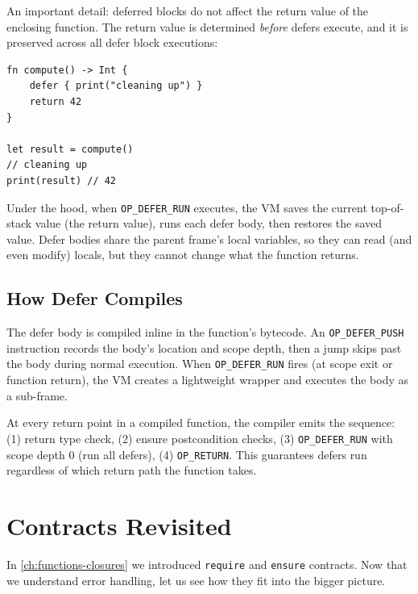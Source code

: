 An important detail: deferred blocks do not affect the return value of the enclosing function. The return value is determined \emph{before} defers execute, and it is preserved across all defer block executions:

\begin{lstlisting}[language=Lattice, caption={Defer does not alter return values}]
fn compute() -> Int {
    defer { print("cleaning up") }
    return 42
}

let result = compute()
// cleaning up
print(result) // 42
\end{lstlisting}

Under the hood, when \lstinline|OP_DEFER_RUN| executes, the VM saves the current top-of-stack value (the return value), runs each defer body, then restores the saved value. Defer bodies share the parent frame's local variables, so they can read (and even modify) locals, but they cannot change what the function returns.

\subsection{How Defer Compiles}\label{sec:defer-compilation}

The defer body is compiled inline in the function's bytecode. An \lstinline|OP_DEFER_PUSH| instruction records the body's location and scope depth, then a jump skips past the body during normal execution. When \lstinline|OP_DEFER_RUN| fires (at scope exit or function return), the VM creates a lightweight wrapper and executes the body as a sub-frame.

At every return point in a compiled function, the compiler emits the sequence: (1) return type check, (2) ensure postcondition checks, (3) \lstinline|OP_DEFER_RUN| with scope depth 0 (run all defers), (4) \lstinline|OP_RETURN|. This guarantees defers run regardless of which return path the function takes.

\section{Contracts Revisited}\label{sec:contracts-revisited}

In \cref{ch:functions-closures} we introduced \lstinline|require| and \lstinline|ensure| contracts. Now that we understand error handling, let us see how they fit into the bigger picture.

